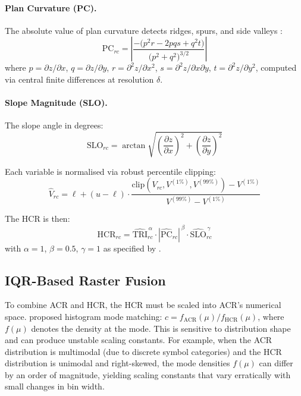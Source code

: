 \documentclass[preprint,11pt]{elsarticle}
\begin{document}
\paragraph{Plan Curvature (PC).}
The absolute value of plan curvature detects ridges, spurs, and side valleys \citep{zevenbergen1987}:
\begin{equation}
  \text{PC}_{rc} = \left| \frac{-\bigl(p^2 r - 2pqs + q^2 t\bigr)}{\bigl(p^2 + q^2\bigr)^{3/2}} \right|
  \label{eq:pc}
\end{equation}
where $p = \partial z / \partial x$, $q = \partial z / \partial y$, $r = \partial^2 z / \partial x^2$, $s = \partial^2 z / \partial x \partial y$, $t = \partial^2 z / \partial y^2$, computed via central finite differences at resolution $\delta$.

\paragraph{Slope Magnitude (SLO).}
The slope angle in degrees:
\begin{equation}
  \text{SLO}_{rc} = \arctan\!\sqrt{\left(\frac{\partial z}{\partial x}\right)^2 + \left(\frac{\partial z}{\partial y}\right)^2}
  \label{eq:slo}
\end{equation}

Each variable is normalised via robust percentile clipping:
\begin{equation}
  \hat{V}_{rc} = \ell + (u - \ell) \cdot \frac{\text{clip}(V_{rc}, V^{(1\%)}, V^{(99\%)}) - V^{(1\%)}}{V^{(99\%)} - V^{(1\%)}}
  \label{eq:norm}
\end{equation}

The HCR is then:
\begin{equation}
  \text{HCR}_{rc} = \widehat{\text{TRI}}_{rc}^{\,\alpha} \cdot |\widehat{\text{PC}}_{rc}|^{\,\beta} \cdot \widehat{\text{SLO}}_{rc}^{\,\gamma}
  \label{eq:hcr}
\end{equation}
with $\alpha = 1$, $\beta = 0.5$, $\gamma = 1$ as specified by \citet{ica2021lcp}.

\subsection{IQR-Based Raster Fusion}
\label{sec:iqr}

To combine ACR and HCR, the HCR must be scaled into ACR's numerical space.
\citet{ica2021lcp} proposed histogram mode matching: $c = f_{\text{ACR}}(\mu) / f_{\text{HCR}}(\mu)$, where $f(\mu)$ denotes the density at the mode.
This is sensitive to distribution shape and can produce unstable scaling constants.
For example, when the ACR distribution is multimodal (due to discrete symbol categories) and the HCR distribution is unimodal and right-skewed, the mode densities $f(\mu)$ can differ by an order of magnitude, yielding scaling constants that vary erratically with small changes in bin width.
\end{document}

